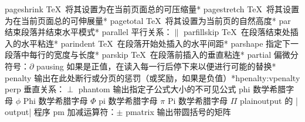 \capcs pageshrink {\TeX\ 将其设置为在当前页面总的可压缩量}*{}
\capcs pagestretch {\TeX\ 将其设置为在当前页面总的可伸展量}*{}
\capcs pagetotal {\TeX\ 将其设置为当前页的自然高度}*{}
\capcs par {结束段落并结束水平模式}*{\@par}
\capcs parallel {平行关系：$\parallel$}{}{}
\capcs parfillskip {\TeX\ 在段落结束处插入的水平粘连}*{}
\capcs parindent {\TeX\ 在段落开始处插入的水平间距}*{}
\capcs parshape {指定下一段落中每行的宽度与长度}*{}
\capcs parskip {\TeX\ 在段落前插入的垂直粘连}*{}
\capcs partial {偏微分符号：$\partial$}{}{}
\capcs pausing {如果是正值，在读入每一行后停下来以便进行可能的替换}*{}
\capcstwo penalty {输出在此处断行或分页的惩罚（或奖励，如果是负值）}*{hpenalty:vpenalty}
\capcs perp {垂直关系：$\perp$}{}{}
\capcs phantom {输出指定子公式大小的不可见公式}{}{}
\capcs phi {数学希腊字母 $\phi$}{}{}
\capcs Phi {数学希腊字母 $\Phi$}{}{}
\capcs pi {数学希腊字母 $\pi$}{}{}
\capcs Pi {数学希腊字母 $\Pi$}{}{}
\capcs plainoutput {\plainTeX 的 |\\output| 程序}{}{}
\capcs pm {加减运算符：$\pm$}{}{}
\capcs pmatrix {输出带圆括号的矩阵}{}{}
